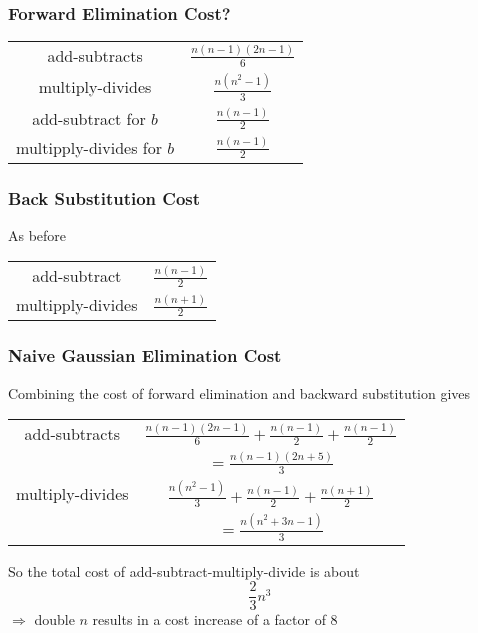 \documentclass[10pt]{beamer}
\begin{document}
\begin{frame}
\frametitle{Forward Elimination Cost?}
\begin{center}
\begin{tabular}{c c}\hline
add-subtracts & $\frac{n(n-1)(2n-1)}{6}$\\
multiply-divides & $\frac{n(n^2 - 1)}{3}$\\
add-subtract for $b$ & $\frac{n(n - 1)}{2}$\\
multipply-divides for $b$ & $\frac{n(n - 1)}{2}$\\\hline
\end{tabular}
\end{center}
\end{frame}
\begin{frame}
\frametitle{Back Substitution Cost}
As before
\begin{center}
\begin{tabular}{c c}\hline
add-subtract & $\frac{n(n - 1)}{2}$\\
multipply-divides & $\frac{n(n + 1)}{2}$\\\hline
\end{tabular}
\end{center}
\end{frame}
\begin{frame}
\frametitle{Naive Gaussian Elimination Cost}
Combining the cost of forward elimination and backward substitution
gives
\begin{center}
\begin{tabular}{c c}\hline
add-subtracts & $\frac{n(n-1)(2n-1)}{6} + \frac{n(n - 1)}{2} + \frac{n(n - 1)}{2}$\\
&  $=\frac{n(n-1)(2n+5)}{3}$\\
multiply-divides & $\frac{n(n^2 - 1)}{3}+\frac{n(n - 1)}{2}+ \frac{n(n + 1)}{2}$\\
& $=\frac{n(n^2 + 3n-1)}{3}$\\\hline
\end{tabular}
\end{center}
So the total cost of add-subtract-multiply-divide is about
\begin{equation*}
  \frac{2}{3} n^3
\end{equation*}
$\Rightarrow$ double $n$ results in a cost increase of a factor of 8
\end{frame}
\end{document}

